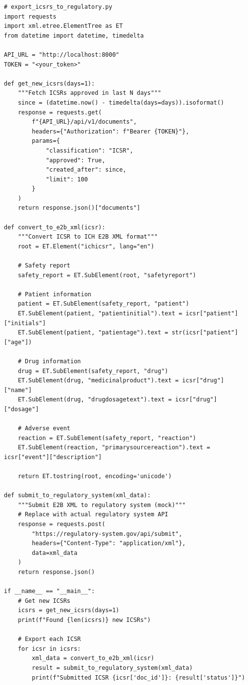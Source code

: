 \begin{lstlisting}[style=pythonstyle]
# export_icsrs_to_regulatory.py
import requests
import xml.etree.ElementTree as ET
from datetime import datetime, timedelta

API_URL = "http://localhost:8000"
TOKEN = "<your_token>"

def get_new_icsrs(days=1):
    """Fetch ICSRs approved in last N days"""
    since = (datetime.now() - timedelta(days=days)).isoformat()
    response = requests.get(
        f"{API_URL}/api/v1/documents",
        headers={"Authorization": f"Bearer {TOKEN}"},
        params={
            "classification": "ICSR",
            "approved": True,
            "created_after": since,
            "limit": 100
        }
    )
    return response.json()["documents"]

def convert_to_e2b_xml(icsr):
    """Convert ICSR to ICH E2B XML format"""
    root = ET.Element("ichicsr", lang="en")
    
    # Safety report
    safety_report = ET.SubElement(root, "safetyreport")
    
    # Patient information
    patient = ET.SubElement(safety_report, "patient")
    ET.SubElement(patient, "patientinitial").text = icsr["patient"]["initials"]
    ET.SubElement(patient, "patientage").text = str(icsr["patient"]["age"])
    
    # Drug information
    drug = ET.SubElement(safety_report, "drug")
    ET.SubElement(drug, "medicinalproduct").text = icsr["drug"]["name"]
    ET.SubElement(drug, "drugdosagetext").text = icsr["drug"]["dosage"]
    
    # Adverse event
    reaction = ET.SubElement(safety_report, "reaction")
    ET.SubElement(reaction, "primarysourcereaction").text = icsr["event"]["description"]
    
    return ET.tostring(root, encoding='unicode')

def submit_to_regulatory_system(xml_data):
    """Submit E2B XML to regulatory system (mock)"""
    # Replace with actual regulatory system API
    response = requests.post(
        "https://regulatory-system.gov/api/submit",
        headers={"Content-Type": "application/xml"},
        data=xml_data
    )
    return response.json()

if __name__ == "__main__":
    # Get new ICSRs
    icsrs = get_new_icsrs(days=1)
    print(f"Found {len(icsrs)} new ICSRs")
    
    # Export each ICSR
    for icsr in icsrs:
        xml_data = convert_to_e2b_xml(icsr)
        result = submit_to_regulatory_system(xml_data)
        print(f"Submitted ICSR {icsr['doc_id']}: {result['status']}")
\end{lstlisting}

